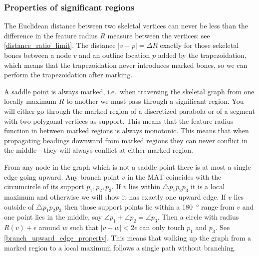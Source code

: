 \subsubsection{Properties of significant regions}
The Euclidean distance between two skeletal vertices can never be less than the difference in the feature radius $R$ measure between the vertices: see \cref{distance_ratio_limit}.
The distance $|v - p| = \Delta R$ exactly for those sekeletal bones between a node $v$ and an outline location $p$ added by the trapezoidation, which means that the trapezoidation never introduces marked bones, so we can perform the trapezoidation after marking.

A saddle point is always marked, i.e.\
when traversing the skeletal graph from one locally maximum $R$ to another we must pass through a significant region.
You will either go through the marked region of a discretized parabola or of a segment with two polygonal vertices as support.
This means that the feature radius function in between marked regions is always monotonic.
This means that when propagating beadings downward from marked regions they can never conflict in the middle - they will always conflict at either marked region.

From any node in the graph which is not a saddle point there is at most a single edge going upward.
Any branch point $v$ in the MAT coincides with the circumcircle of its support $p_1, p_2, p_3$.
If $v$ lies within $\triangle p_1 p_2 p_3$ it is a local maximum and otherwise we will show it has exactly one upward edge.
If $v$ lies outside of $\triangle p_1 p_2 p_3$ then those support points lie within a \SI{180}{\degree} range from $v$
and one point lies in the middle, say $\angle p_1 + \angle p_2 = \angle p_3$.
Then a circle with radius $R(v) + \epsilon$ around $w$ such that $|v-w| < 2 \epsilon$ can only touch $p_1$ and $p_3$.
See \cref{branch_upward_edge_property}.
This means that walking up the graph from a marked region to a local maximum follows a single path without branching.

